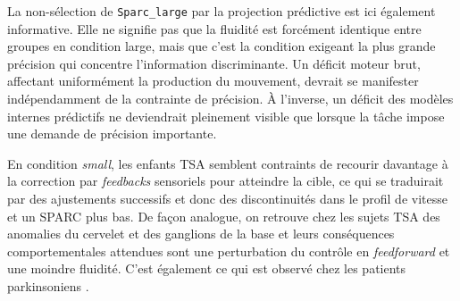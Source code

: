 La non-sélection de \texttt{Sparc\_large} par la projection prédictive est ici également informative. Elle ne signifie pas que la fluidité est forcément identique entre groupes en condition large, mais que c'est la condition exigeant la plus grande précision qui concentre l'information discriminante. Un déficit moteur brut, affectant uniformément la production du mouvement, devrait se manifester indépendamment de la contrainte de précision. À l'inverse, un déficit des modèles internes prédictifs ne deviendrait pleinement visible que lorsque la tâche impose une demande de précision importante.%


En condition \textit{small}, les enfants TSA semblent contraints de recourir davantage à la correction par \textit{feedbacks} sensoriels pour atteindre la cible, ce qui se traduirait par des ajustements successifs et donc des discontinuités dans le profil de vitesse et un SPARC plus bas. De façon analogue, on retrouve chez les sujets TSA des anomalies du cervelet et des ganglions de la base \parencite{McAlonan2009Nov, Guo2024Apr} et leurs conséquences comportementales attendues sont une perturbation du contrôle en \textit{feedforward} \parencite{Manto2012Jun} et une moindre fluidité. C'est également ce qui est observé chez les patients parkinsoniens \parencite{Dounskaia2009Mar}. %

%

\medskip 

